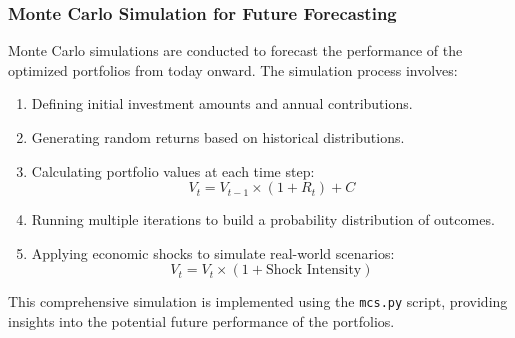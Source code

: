 \subsubsection{Monte Carlo Simulation for Future Forecasting}
Monte Carlo simulations are conducted to forecast the performance of the optimized portfolios from today onward. The simulation process involves:
\begin{enumerate}
    \item Defining initial investment amounts and annual contributions.
    \item Generating random returns based on historical distributions.
    \item Calculating portfolio values at each time step:
    \begin{equation}
        V_t = V_{t-1} \times (1 + R_t) + C
    \end{equation}
    \item Running multiple iterations to build a probability distribution of outcomes.
    \item Applying economic shocks to simulate real-world scenarios:
    \begin{equation}
        V_t = V_t \times (1 + \text{Shock Intensity})
    \end{equation}
\end{enumerate}
This comprehensive simulation is implemented using the \texttt{mcs.py} script, providing insights into the potential future performance of the portfolios.

\newpage
